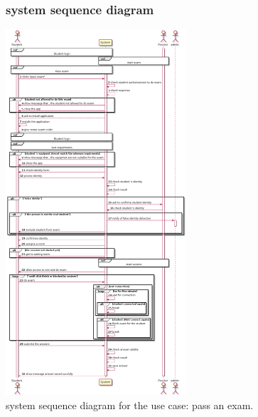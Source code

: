 \documentclass[]{uc2pfecaneva}
\begin{document}
\begin{figure}[]
	\subsubsection{system sequence diagram}
	\centering
	\includegraphics[width=0.6\textwidth]{images/pass_exam}
	
	\caption{system sequence diagram for the use case: pass an exam.}
\end{figure}
\clearpage
\end{document}
